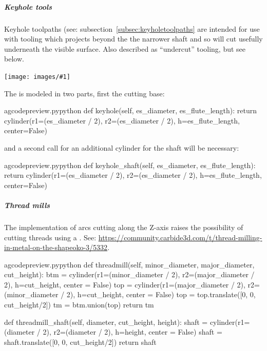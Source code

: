 \documentclass{ltxdoc}
\newcommand{\includeimage}[1]{\bigskip\noindent\texttt{[image: images/\#1]}\bigskip}
\begin{document}
\subparagraph{Keyhole tools}

Keyhole toolpaths (see: subsection~\ref{subsec:keyholetoolpaths} are intended for use with tooling which projects beyond the the narrower shaft and so will cut usefully underneath the visible surface. Also described as ``undercut'' tooling, but see below.

\includeimage{keyhole_router_bits.pdf}%

The  is modeled in two parts, first the cutting base:

\lstset{firstnumber=\thegcpy}
\begin{writecode}{a}{gcodepreview.py}{python}
    def keyhole(self, es_diameter, es_flute_length):
        return cylinder(r1=(es_diameter / 2), r2=(es_diameter / 2), h=es_flute_length, center=False)

\end{writecode}
\addtocounter{gcpy}{3}

\noindent and a second call for an additional cylinder for the shaft will be necessary:

\lstset{firstnumber=\thegcpy}
\begin{writecode}{a}{gcodepreview.py}{python}
    def keyhole_shaft(self, es_diameter, es_flute_length):
        return cylinder(r1=(es_diameter / 2), r2=(es_diameter / 2), h=es_flute_length, center=False)

\end{writecode}
\addtocounter{gcpy}{3}

\subparagraph{Thread mills}

\label{subpara:threadmills}The implementation of arcs cutting along the Z-axis raises the 
possibility of cutting threads using a . 
See: \url{https://community.carbide3d.com/t/thread-milling-in-metal-on-the-shapeoko-3/5332}.

\lstset{firstnumber=\thegcpy}
\begin{writecode}{a}{gcodepreview.py}{python}
    def threadmill(self, minor_diameter, major_diameter, cut_height):
        btm = cylinder(r1=(minor_diameter / 2), r2=(major_diameter / 2), h=cut_height, center = False)
        top = cylinder(r1=(major_diameter / 2), r2=(minor_diameter / 2), h=cut_height, center = False)
        top = top.translate([0, 0, cut_height/2])
        tm = btm.union(top)
        return tm

    def threadmill_shaft(self, diameter, cut_height, height):
        shaft = cylinder(r1=(diameter / 2), r2=(diameter / 2), h=height, center = False)
        shaft = shaft.translate([0, 0, cut_height/2])
        return shaft

\end{writecode}
\addtocounter{gcpy}{12}
\end{document}
